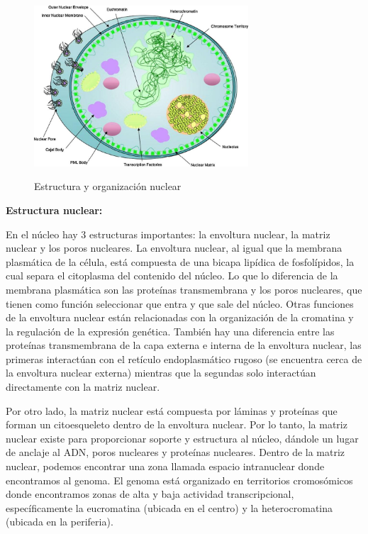 \documentclass[12pt, letterpaper]{article}
\begin{document}
\begin{figure}[h]
\centering
	\includegraphics[width=8cm]{nucleus-structure-rynearsonNuclearStructureOrganization2011.jpg}
	\label{fig: nucleus-structure}
	\caption{Estructura y organización nuclear}
	\autocite{rynearsonNuclearStructureOrganization2011}
\end{figure}

\pagebreak

\textbf{Estructura nuclear:}

En el núcleo hay 3 estructuras importantes: la envoltura nuclear, la matriz nuclear y los poros nucleares. La envoltura nuclear, al igual que la membrana plasmática de la célula, está compuesta de una bicapa lipídica de fosfolípidos, la cual separa el citoplasma del contenido del núcleo. Lo que lo diferencia de la membrana plasmática son las proteínas transmembrana y los poros nucleares, que tienen como función seleccionar que entra y que sale del núcleo. Otras funciones de la envoltura nuclear están relacionadas con la organización de la cromatina y la regulación de la expresión genética. También hay una diferencia entre las proteínas transmembrana de la capa externa e interna de la envoltura nuclear, las primeras interactúan con el retículo endoplasmático rugoso (se encuentra cerca de la envoltura nuclear externa) mientras que la segundas solo interactúan directamente con la matriz nuclear.

Por otro lado, la matriz nuclear está compuesta por láminas y proteínas que forman un citoesqueleto dentro de la envoltura nuclear. Por lo tanto, la matriz nuclear existe para proporcionar soporte y estructura al núcleo, dándole un lugar de anclaje al ADN, poros nucleares y proteínas nucleares. Dentro de la matriz nuclear, podemos encontrar una zona llamada espacio intranuclear donde encontramos al genoma. El genoma está organizado en territorios cromosómicos donde encontramos zonas de alta y baja actividad transcripcional, específicamente la eucromatina (ubicada en el centro) y la heterocromatina (ubicada en la periferia). 
\end{document}
